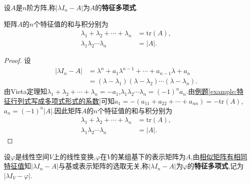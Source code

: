 \documentclass[../../main.tex]{subfiles}
\begin{document}
\begin{definition}[特征多项式]
设$A$是$n$阶方阵,称$|\lambda I_n - A|$为$A$的\textbf{特征多项式}.
\end{definition}

\begin{theorem}[特征值的和与积]\label{theorem:特征值的和与积}
矩阵$A$的$n$个特征值的和与积分别为
\begin{align*}
\lambda_1 + \lambda_2 + \cdots + \lambda_n &= \mathrm{tr}(A), \\
\lambda_1 \lambda_2 \cdots \lambda_n &= |A|.
\end{align*}
\end{theorem}
\begin{proof}
设
\begin{align*}
|\lambda I_n - A| &= \lambda^n + a_1 \lambda^{n-1} + \cdots + a_{n-1} \lambda + a_n \\
&= (\lambda - \lambda_1)(\lambda - \lambda_2) \cdots (\lambda - \lambda_n).
\end{align*}
由Vieta定理知$\lambda_1 + \lambda_2 + \cdots + \lambda_n = -a_1$,$\lambda_1 \lambda_2 \cdots \lambda_n = (-1)^n a_n$.由\hyperref[example:特征行列式写成多项式形式的系数]{例题\ref{example:特征行列式写成多项式形式的系数}}可知$a_1 = -(a_{11} + a_{22} + \cdots + a_{nn}) = -\mathrm{tr}(A)$,$a_n = (-1)^n |A|$.因此矩阵$A$的$n$个特征值的和与积分别为
\begin{align*}
\lambda_1 + \lambda_2 + \cdots + \lambda_n &= \mathrm{tr}(A), \\
\lambda_1 \lambda_2 \cdots \lambda_n &= |A|.
\end{align*}
\end{proof}

\begin{definition}[特征多项式]
设$\varphi$是线性空间$V$上的线性变换,$\varphi$在$V$的某组基下的表示矩阵为$A$,由\hyperref[theorem:相似矩阵有相同特征值]{相似矩阵有相同特征值}知$|\lambda I_n - A|$与基或表示矩阵的选取无关,称$|\lambda I_n - A|$为$\varphi$的\textbf{特征多项式},记为$|\lambda I_V - \varphi|$.
\end{definition}
\end{document}
